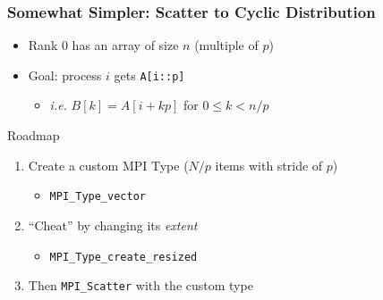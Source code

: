 \documentclass[xcolor={rgb,x11names,svgnames},rgb,x11names,svgnames]{beamer}
\begin{document}

\begin{frame}[label=cyclic]
  \frametitle{Somewhat Simpler: \textbf{Scatter} to Cyclic Distribution}

  \begin{itemize}
  \item Rank 0 has an array of size $n$ (multiple of $p$)
  \item Goal: process $i$ gets \texttt{A[i::p]}
    \begin{itemize}
    \item \textit{i.e.} $B[k] = A[i + kp]$ for $0 \leq k < n/p$
    \end{itemize}
  \end{itemize}
  
  \medskip

  \begin{block}{Roadmap}
    \begin{enumerate}
    \item Create a custom MPI Type ($N/p$ items with stride of $p$)
      \begin{itemize}
      \item \texttt{MPI_Type_vector}
      \end{itemize}
      
    \item ``Cheat'' by changing its \emph{extent} 
      \begin{itemize}
      \item \texttt{MPI_Type_create_resized}
      \end{itemize}
      
    \item Then \texttt{MPI_Scatter} with the custom type
    \end{enumerate}
  \end{block}
\end{frame}

\end{document}
